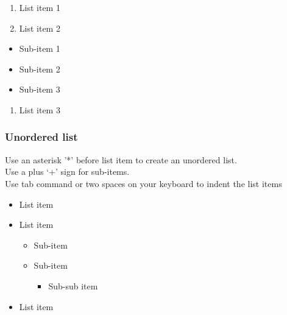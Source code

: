 \documentclass[
]{book}
\providecommand{\tightlist}{%
  \setlength{\itemsep}{0pt}\setlength{\parskip}{0pt}}
\begin{document}
\begin{enumerate}
\def\labelenumi{\arabic{enumi}.}
\tightlist
\item
  List item 1\\
\item
  List item 2\\
\end{enumerate}

\begin{itemize}
\tightlist
\item
  Sub-item 1\\
\item
  Sub-item 2\\
\item
  Sub-item 3\\
\end{itemize}

\begin{enumerate}
\def\labelenumi{\arabic{enumi}.}
\setcounter{enumi}{2}
\tightlist
\item
  List item 3
\end{enumerate}

\hypertarget{unordered-list}{%
\subsubsection{Unordered list}\label{unordered-list}}

Use an asterisk '*' before list item to create an unordered list.\\
Use a plus `+' sign for sub-items.\\
Use tab command or two spaces on your keyboard to indent the list items

\begin{itemize}
\tightlist
\item
  List item
\item
  List item

  \begin{itemize}
  \tightlist
  \item
    Sub-item
  \item
    Sub-item

    \begin{itemize}
    \tightlist
    \item
      Sub-sub item
    \end{itemize}
  \end{itemize}
\item
  List item
\end{itemize}
\end{document}
